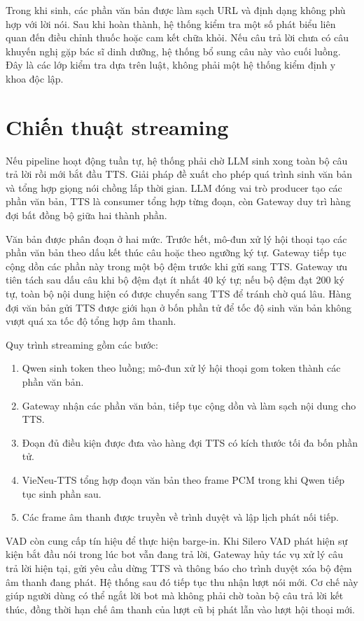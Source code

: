 \documentclass[a4paper,13pt,oneside]{report}
\begin{document}
Trong khi sinh, các phần văn bản được làm sạch URL và định dạng không phù hợp với lời nói. Sau khi hoàn thành, hệ thống kiểm tra một số phát biểu liên quan đến điều chỉnh thuốc hoặc cam kết chữa khỏi. Nếu câu trả lời chưa có câu khuyến nghị gặp bác sĩ dinh dưỡng, hệ thống bổ sung câu này vào cuối luồng. Đây là các lớp kiểm tra dựa trên luật, không phải một hệ thống kiểm định y khoa độc lập.

\section{Chiến thuật streaming}

Nếu pipeline hoạt động tuần tự, hệ thống phải chờ LLM sinh xong toàn bộ câu trả lời rồi mới bắt đầu TTS. Giải pháp đề xuất cho phép quá trình sinh văn bản và tổng hợp giọng nói chồng lấp thời gian. LLM đóng vai trò producer tạo các phần văn bản, TTS là consumer tổng hợp từng đoạn, còn Gateway duy trì hàng đợi bất đồng bộ giữa hai thành phần.

Văn bản được phân đoạn ở hai mức. Trước hết, mô-đun xử lý hội thoại tạo các phần văn bản theo dấu kết thúc câu hoặc theo ngưỡng ký tự. Gateway tiếp tục cộng dồn các phần này trong một bộ đệm trước khi gửi sang TTS. Gateway ưu tiên tách sau dấu câu khi bộ đệm đạt ít nhất 40 ký tự; nếu bộ đệm đạt 200 ký tự, toàn bộ nội dung hiện có được chuyển sang TTS để tránh chờ quá lâu. Hàng đợi văn bản gửi TTS được giới hạn ở bốn phần tử để tốc độ sinh văn bản không vượt quá xa tốc độ tổng hợp âm thanh.

Quy trình streaming gồm các bước:

\begin{enumerate}[label=\arabic*)]
    \item Qwen sinh token theo luồng; mô-đun xử lý hội thoại gom token thành các phần văn bản.
    \item Gateway nhận các phần văn bản, tiếp tục cộng dồn và làm sạch nội dung cho TTS.
    \item Đoạn đủ điều kiện được đưa vào hàng đợi TTS có kích thước tối đa bốn phần tử.
    \item VieNeu-TTS tổng hợp đoạn văn bản theo frame PCM trong khi Qwen tiếp tục sinh phần sau.
    \item Các frame âm thanh được truyền về trình duyệt và lập lịch phát nối tiếp.
\end{enumerate}

VAD còn cung cấp tín hiệu để thực hiện barge-in. Khi Silero VAD phát hiện sự kiện bắt đầu nói trong lúc bot vẫn đang trả lời, Gateway hủy tác vụ xử lý câu trả lời hiện tại, gửi yêu cầu dừng TTS và thông báo cho trình duyệt xóa bộ đệm âm thanh đang phát. Hệ thống sau đó tiếp tục thu nhận lượt nói mới. Cơ chế này giúp người dùng có thể ngắt lời bot mà không phải chờ toàn bộ câu trả lời kết thúc, đồng thời hạn chế âm thanh của lượt cũ bị phát lẫn vào lượt hội thoại mới.
\end{document}
